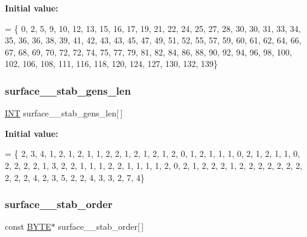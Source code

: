 {\bfseries Initial value\+:}
\begin{DoxyCode}
= \{ 0, 2, 5, 9, 10, 12, 13, 15, 16, 17, 
    19, 21, 22, 24, 25, 27, 28, 30, 30, 31, 
    33, 34, 35, 36, 36, 38, 39, 41, 42, 43, 
    43, 45, 47, 49, 51, 52, 55, 57, 59, 60, 
    61, 62, 64, 66, 67, 68, 69, 70, 72, 72, 
    74, 75, 77, 79, 81, 82, 84, 86, 88, 90, 
    92, 94, 96, 98, 100, 102, 106, 108, 111, 116, 
    118, 120, 124, 127, 130, 132, 139\}
\end{DoxyCode}
\mbox{\label{surface__37_8_c_a23da083d6abae6cb861ba3f69c53e7ec}} 
\subsubsection{\texorpdfstring{surface\+\_\+\_\+stab\+\_\+gens\+\_\+len}{surface\_37\_stab\_gens\_len}}
{\footnotesize\ttfamily \mbox{\hyperlink{galois_8h_a09fddde158a3a20bd2dcadb609de11dc}{I\+NT}} surface\+\_\+\_\+stab\+\_\+gens\+\_\+len\mbox{[}$\,$\mbox{]}}

{\bfseries Initial value\+:}
\begin{DoxyCode}
= \{ 2, 3, 4, 1, 2, 1, 2, 1, 1, 2, 
    2, 1, 2, 1, 2, 1, 2, 0, 1, 2, 
    1, 1, 1, 0, 2, 1, 2, 1, 1, 0, 
    2, 2, 2, 2, 1, 3, 2, 2, 1, 1, 
    1, 2, 2, 1, 1, 1, 1, 2, 0, 2, 
    1, 2, 2, 2, 1, 2, 2, 2, 2, 2, 
    2, 2, 2, 2, 2, 4, 2, 3, 5, 2, 
    2, 4, 3, 3, 2, 7, 4\}
\end{DoxyCode}
\mbox{\label{surface__37_8_c_a00472492e7008e50e20f334a5b99a9ab}} 
\subsubsection{\texorpdfstring{surface\+\_\+\_\+stab\+\_\+order}{surface\_37\_stab\_order}}
{\footnotesize\ttfamily const \mbox{\hyperlink{galois_8h_ab6cc7b4aeb6ea31aba2b3fbfc83ff5e6}{B\+Y\+TE}}$\ast$ surface\+\_\+\_\+stab\+\_\+order\mbox{[}$\,$\mbox{]}}

